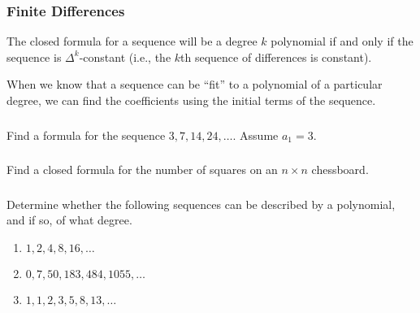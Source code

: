 \documentclass[11pt, compress]{beamer}
\begin{document}
\begin{frame}
\frametitle{Finite Differences}
 The closed formula for a sequence will be a degree \(k\) polynomial if and only if the sequence is \(\Delta^k\)-constant (i.e., the \(k\)th sequence of differences is constant).
 
\pause \vfill 

When we know that a sequence can be ``fit'' to a polynomial of a particular degree, we can find the coefficients using the initial terms of the sequence.
\end{frame}
 
\begin{frame}
\frametitle{}
\begin{example}[2.3.2]Find a formula for the sequence \(3, 7, 14, 24,\ldots\). Assume \(a_1 = 3\).
\end{example}
\end{frame}
 
\begin{frame}
\frametitle{}
\begin{example}[2.3.3]Find a closed formula for the number of squares on an \(n \times n\) chessboard.
\end{example}
\end{frame}
 
\begin{frame}
\frametitle{}
\begin{example}[2.3.4]Determine whether the following sequences can be described by a polynomial, and if so, of what degree.\begin{enumerate}
\item{} \(\displaystyle 1, 2, 4, 8, 16, \ldots\)

\item{} \(\displaystyle 0, 7, 50, 183, 484, 1055, \ldots\)

\item{} \(\displaystyle 1,1,2,3,5,8,13,\ldots\)
\end{enumerate}

\end{example}
\end{frame}
 
\end{document}
